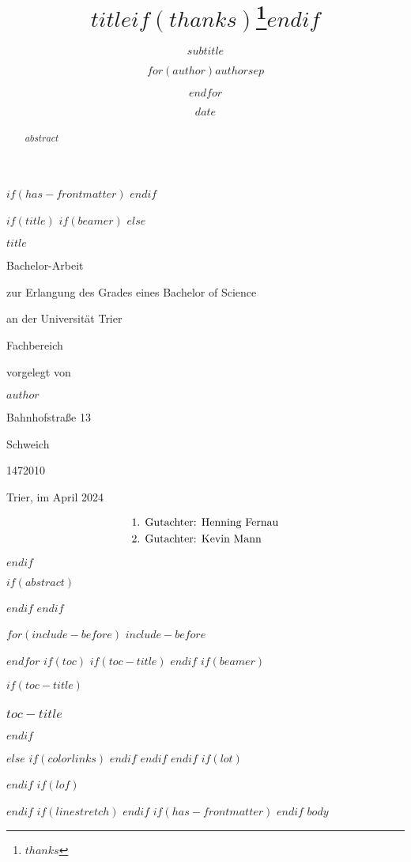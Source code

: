 \documentclass[
  $if(fontsize)$
  $fontsize$,
  $endif$
  $if(lang)$
  $babel-lang$,
  $endif$
  $if(papersize)$
  $papersize$paper,
  $endif$
  $if(beamer)$
  ignorenonframetext,
  $if(handout)$
  handout,
  $endif$
  $if(aspectratio)$
  aspectratio=$aspectratio$,
  $endif$
  $endif$
  $for(classoption)$
  $classoption$$sep$,
  $endfor$
]{$documentclass$}
\title{$title$$if(thanks)$\thanks{$thanks$}$endif$}
\subtitle{$subtitle$}
\author{$for(author)$$author$$sep$ \and $endfor$}
\date{$date$}
\institute{$for(institute)$$institute$$sep$ \and $endfor$}
\begin{document}
$if(has-frontmatter)$
\frontmatter
$endif$

$if(title)$
$if(beamer)$
\frame{\titlepage}
$else$
\begin{titlepage}
  \begin{center}
    \vspace*{1cm}

    \Huge
    \textbf{$title$}

    \vspace{2cm}
    \Large

    Bachelor-Arbeit

    zur Erlangung des Grades eines Bachelor of Science

    \vspace{1cm}

    an der Universität Trier 
    
    Fachbereich

    \vspace{2cm}
    vorgelegt von

    \textbf{$author$}

    Bahnhofstraße 13

    Schweich

    1472010
    \vfill

    Trier, im April 2024
    \vspace{1cm}


    \begin{align*}
      &\textnormal{1. Gutachter: Henning Fernau}\\
      &\textnormal{2. Gutachter: Kevin Mann}
    \end{align*}
    
    
  \end{center}
\end{titlepage}
$endif$


\clearpage


$if(abstract)$
\begin{abstract}
  $abstract$
\end{abstract}
$endif$
$endif$

$for(include-before)$
$include-before$

$endfor$
$if(toc)$
$if(toc-title)$
\renewcommand*\contentsname{$toc-title$}
$endif$
$if(beamer)$
\begin{frame}[allowframebreaks]
  $if(toc-title)$
  \frametitle{$toc-title$}
  $endif$
  \tableofcontents[hideallsubsections]
\end{frame}
$else$
{
    $if(colorlinks)$
    \hypersetup{linkcolor=$if(toccolor)$$toccolor$$else$$endif$}
    $endif$
    \setcounter{tocdepth}{$toc-depth$}
    \tableofcontents
  }
$endif$
$endif$
$if(lot)$
\listoftables
$endif$
$if(lof)$
\listoffigures
$endif$
$if(linestretch)$
$endif$
$if(has-frontmatter)$
\mainmatter
$endif$
$body$
\end{document}
